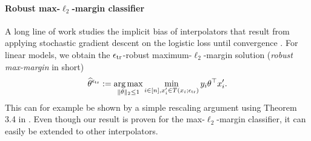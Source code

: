


\paragraph{Robust max-$\ell_2$-margin classifier}

A long line of work studies the implicit bias of interpolators
that result from applying stochastic gradient descent on the logistic loss until convergence \cite{liu20, Ji19, Chizat20, nacson19}.
For linear models, we obtain the $\epsilon_{\text{tr}}$-robust maximum-$\ell_2$-margin solution (\emph{robust max-margin} in short) 
\begin{equation}
  \label{eq:maxmargin}
  \widehat{\theta}^{\epsilon_{\text{tr}}} := \operatorname*{arg\,max}_{\|\theta\|_2\leq 1} \min_{i\in [n], x_i' \in T({x_i};{\epsilon_{\text{tr}}})} y_i \theta^\top x_i'.
\end{equation}
This can for example be shown by a simple rescaling
argument using Theorem 3.4 in \cite{liu20}.  Even though our result is proven for the max-$\ell_2$-margin classifier,
it can easily be extended to other interpolators.



